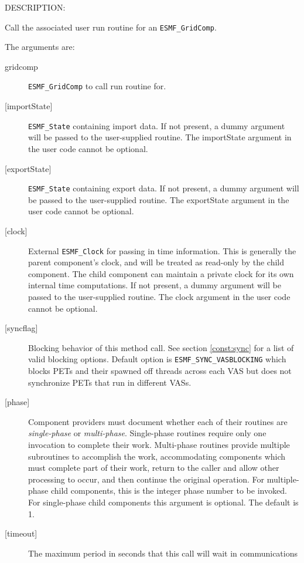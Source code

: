 {\sf DESCRIPTION:\\ }


   Call the associated user run routine for
   an {\tt ESMF\_GridComp}.
  
   The arguments are:
   \begin{description}
   \item[gridcomp]
     {\tt ESMF\_GridComp} to call run routine for.
   \item[{[importState]}]
     {\tt ESMF\_State} containing import data. If not present, a dummy
     argument will be passed to the user-supplied routine.  The
     importState argument in the user code cannot be optional.
   \item[{[exportState]}]
     {\tt ESMF\_State} containing export data. If not present, a dummy
     argument will be passed to the user-supplied routine.  The
     exportState argument in the user code cannot be optional.
   \item[{[clock]}]
     External {\tt ESMF\_Clock} for passing in time information.
     This is generally the parent component's clock, and will be treated
     as read-only by the child component.  The child component can maintain
     a private clock for its own internal time computations. If not present, a dummy
     argument will be passed to the user-supplied routine.  The
     clock argument in the user code cannot be optional.
   \item[{[syncflag]}]
     Blocking behavior of this method call. See section \ref{const:sync}
     for a list of valid blocking options. Default option is
     {\tt ESMF\_SYNC\_VASBLOCKING} which blocks PETs and their spawned off threads
     across each VAS but does not synchronize PETs that run in different VASs.
   \item[{[phase]}]
     Component providers must document whether each of their
     routines are {\em single-phase} or {\em multi-phase}.
     Single-phase routines require only one invocation to complete
     their work.
     Multi-phase routines provide multiple subroutines to accomplish
     the work, accommodating components which must complete part of their
     work, return to the caller and allow other processing to occur,
     and then continue the original operation.
     For multiple-phase child components, this is the integer phase
     number to be invoked.
     For single-phase child components this argument is optional. The default is
     1.
   \item[{[timeout]}]
     The maximum period in seconds that this call will wait in communications

\end{description}
